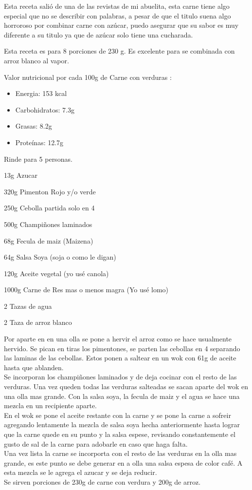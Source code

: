 Esta receta salió de una de las revistas de mi abuelita, esta carne tiene algo especial que no se describir con palabras, a pesar de que el titulo suena algo horroroso por combinar carne con azúcar, puedo asegurar que su sabor es muy diferente a su titulo ya que de azúcar solo tiene una cucharada.

Esta receta es para 8 porciones de 230 g. Es excelente para se combinada con arroz blanco al vapor.

Valor nutricional por cada 100g de Carne con verduras :
\begin{itemize}
\item Energia: 153 kcal
\item Carbohidratos: 7.3g
\item Grasas: 8.2g
\item Proteínas: 12.7g
\end{itemize}

Rinde para 5 personas.

\begin{ingredientes}
\item 13g Azucar
\item 320g Pimenton Rojo y/o verde
\item 250g Cebolla partida solo en 4
\item 500g Champiñones laminados
\item 68g Fecula de maiz (Maizena)
\item 64g Salsa Soya (soja o como le digan)
\item 120g Aceite vegetal (yo usé canola)
\item 1000g Carne de Res mas o menos magra (Yo usé lomo)
\item 2 Tazas de agua
\item 2 Taza de arroz blanco
\end{ingredientes}
\preparacion
Por aparte en en una olla se pone a hervir el arroz como se hace usualmente hervido. Se pican en tiras los pimentones, se parten las cebollas en 4 separando las laminas de las cebollas. Estos ponen a saltear en un wok con 61g de aceite hasta que ablanden.\\

Se incorporan los champiñones laminados y de deja cocinar con el resto de las verduras. Una vez queden todas las verduras salteadas se sacan aparte del wok en una olla mas grande. Con la salsa soya, la fecula de maiz y el agua se hace una mezcla en un recipiente aparte.\\

En el wok se pone el aceite restante con la carne y se pone la carne a sofreir agregando lentamente la mezcla de salsa soya hecha anteriormente hasta lograr que la carne quede en su punto y la salsa espese, revisando constantemente el gusto de sal de la carne para adobarle en caso que haga falta.\\

Una vez lista la carne se incorporta con el resto de las verduras en la olla mas grande, es este punto se debe generar en a olla una salsa espesa de color café. A esta mezcla se le agrega el azucar y se deja reducir.\\

Se sirven porciones de 230g de carne con verdura y 200g de arroz.